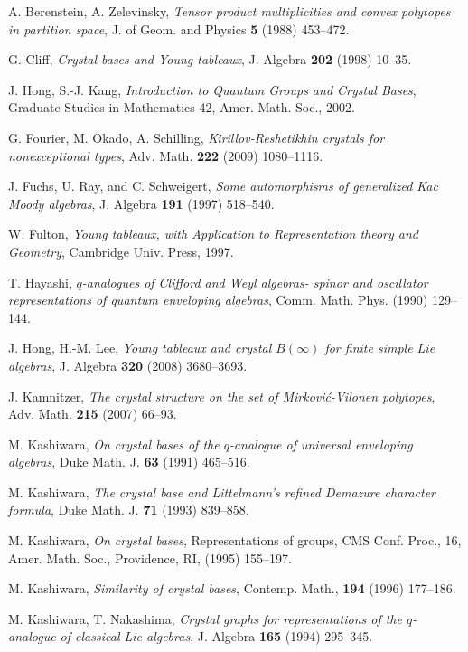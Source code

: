 \documentclass[leqno,11pt]{amsart}
\numberwithin{equation}{section}
\begin{document}
{\small
\begin{thebibliography}{HK}

 
A. Berenstein, A. Zelevinsky, {\em Tensor product multiplicities and convex polytopes in
partition space}, J. of Geom. and Physics \textbf{5} (1988)  453--472.  
  
  
G. Cliff, {\em Crystal bases and Young tableaux}, J. Algebra \textbf{202} (1998) 10--35.  
  
J. Hong, S.-J. Kang, {\em Introduction to Quantum Groups and Crystal Bases}, Graduate Studies in
Mathematics 42,  Amer. Math. Soc., 2002.

G. Fourier, M. Okado, A. Schilling, {\em Kirillov-Reshetikhin crystals for nonexceptional types}, Adv. Math. \textbf{222} (2009) 1080--1116.

J. Fuchs, U. Ray, and C. Schweigert, {\em Some automorphisms of generalized Kac Moody
algebras}, J. Algebra \textbf{191} (1997) 518--540.

W. Fulton, {\em Young tableaux, with Application to Representation
theory and Geometry}, Cambridge Univ. Press, 1997.

T. Hayashi, {\em $q$-analogues of Clifford and Weyl algebras- spinor and oscillator representations of quantum enveloping algebras}, Comm. Math. Phys.  (1990) 129--144.

J. Hong, H.-M. Lee, {\em Young tableaux and crystal $B(\infty)$ for finite simple Lie algebras}, J. Algebra \textbf{320} (2008) 3680--3693.

J. Kamnitzer, {\em  The crystal structure on the set of Mirkovi\'{c}-Vilonen polytopes},  Adv. Math. \textbf{215} (2007) 66--93.

M. Kashiwara, {\em On crystal bases of the $q$-analogue of universal enveloping algebras}, Duke Math. J. \textbf{63} (1991) 465--516.

M. Kashiwara, {\em The crystal base and Littelmann's refined Demazure character formula}, Duke Math. J. \textbf{71} (1993) 839--858.

M. Kashiwara, {\em On crystal bases}, Representations of groups,
CMS Conf. Proc., 16, Amer. Math. Soc., Providence, RI, (1995) 155--197.

M. Kashiwara, {\em Similarity of crystal bases}, Contemp. Math., \textbf{194} (1996) 177--186.

M. Kashiwara, T. Nakashima, {\em Crystal graphs for representations of the $q$-analogue of classical Lie algebras}, J. Algebra \textbf{165} (1994) 295--345.


\end{thebibliography}}
\end{document}
